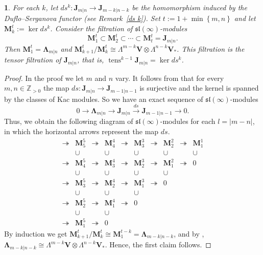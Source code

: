 \documentclass[12pt,oneside,english]{amsart}
\numberwithin{equation}{section}
\numberwithin{figure}{section}
\theoremstyle{plain}
\theoremstyle{plain}
\theoremstyle{remark}
\theoremstyle{definition}
\theoremstyle{plain}
\theoremstyle{remark}
\theoremstyle{definition}
\theoremstyle{plain}
\theoremstyle{plain}
\newtheorem{prop}[thm]{\protect\propositionname}
\theoremstyle{definition}
\providecommand{\propositionname}{Proposition}
\newcommand{\bV}{\mathbf{V}}
\newcommand{\bJ}{\mathbf{J}}
\newcommand{\bM}{\mathbf{M}}
\newcommand{\bW}{\mathbf{\Lambda}}
\newcommand{\tens}{\operatorname{tens}}
\begin{document}
\begin{prop}
\label{thm:module structure} For each $k$, let $ds^{k}:\bJ_{m|n}\to\bJ_{m-k|n-k}$ be the homomorphism induced by the Duflo--Serganova functor (see Remark~\ref{ds k}). Set $t:=1+\min\left\{ m,n\right\} $ and let $\bM_{k}^{t}:=\ker ds^{k}$. Consider the filtration
 of $\mathfrak{sl}\left(\infty\right)$-modules
$$\bM_{1}^{t}\subset\bM_{2}^{t}\subset\cdots\subset\bM_{t}^{t}=\bJ_{m|n}.$$ Then $\bM_{1}^{t}=\bW_{m|n}$ and $\bM_{k+1}^{t}/\bM_{k}^{t}\cong\Lambda^{m-k}\bV\otimes\Lambda^{n-k}\bV_{*}$. This filtration is the tensor filtration of $\bJ_{m|n}$, that is, $\tens^{k-1}\bJ_{m|n}=\ker ds^k$.
\end{prop}
\begin{proof} In the proof we let $m$ and $n$ vary.
It follows from \cite[Theorems 17 and 20]{HR} that for every $m,n\in\mathbb Z_{>0}$ the map $ds:{\bJ}_{m|n}\rightarrow{\bJ}_{m-1|n-1}$ is surjective and the kernel is spanned by the
classes of Kac modules. So we have an exact sequence of $\mathfrak{sl}(\infty)$-modules
\[
0\to\bW_{m|n}\to\bJ_{m|n}\stackrel{ds}{\to}\bJ_{m-1|n-1}\to0.
\]
Thus, we obtain the following diagram of
$\mathfrak{sl}\left(\infty\right)$-modules for each $l=|m-n|$, in which the horizontal arrows represent the map $ds$.
\[
\begin{array}{cccccccccc}
\twoheadrightarrow & \bM_{5}^{5} & \twoheadrightarrow & \bM_{4}^{4} & \twoheadrightarrow & \bM_{3}^{3} & \twoheadrightarrow & \bM_{2}^{2} & \twoheadrightarrow & \bM_{1}^{1}\\
 & \cup &  & \cup &  & \cup &  & \cup &  & \cup\\
\twoheadrightarrow & \bM_{4}^{5} & \twoheadrightarrow & \bM_{3}^{4} & \twoheadrightarrow & \bM_{2}^{3} & \twoheadrightarrow & \bM_{1}^{2} & \twoheadrightarrow & 0\\
 & \cup &  & \cup &  & \cup &  & \cup\\
\twoheadrightarrow & \bM_{3}^{5} & \twoheadrightarrow & \bM_{2}^{4} & \twoheadrightarrow & \bM_{1}^{3} & \twoheadrightarrow & 0\\
 & \cup &  & \cup &  & \cup\\
\twoheadrightarrow & \bM_{2}^{5} & \twoheadrightarrow & \bM_{1}^{4} & \twoheadrightarrow & 0\\
 & \cup &  & \cup\\
\twoheadrightarrow & \bM_{1}^{5} & \twoheadrightarrow & 0
\end{array}
\]
By induction we get  $\bM_{k+1}^{t}/\bM_{k}^{t}\cong\bM_{1}^{t-k}=\bW_{m-k|n-k}$, and by \cite{B}, $\bW_{m-k|n-k}\cong\Lambda^{m-k}\bV\otimes\Lambda^{n-k}\bV_{*}$. Hence, the first claim follows.



\end{proof}
\end{document}
